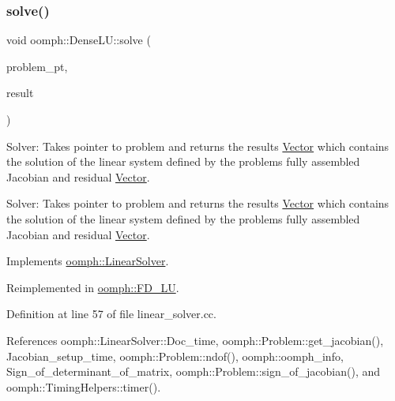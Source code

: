 \mbox{\label{classoomph_1_1DenseLU_ac354b224819146618ce8a1396f8f980e}} 
\subsubsection{\texorpdfstring{solve()}{solve()}\hspace{0.1cm}{\footnotesize\ttfamily [1/3]}}
{\footnotesize\ttfamily void oomph\+::\+Dense\+L\+U\+::solve (\begin{DoxyParamCaption}\item[{\hyperlink{classoomph_1_1Problem}{Problem} $\ast$const \&}]{problem\+\_\+pt,  }\item[{\hyperlink{classoomph_1_1DoubleVector}{Double\+Vector} \&}]{result }\end{DoxyParamCaption})\hspace{0.3cm}{\ttfamily [virtual]}}



Solver\+: Takes pointer to problem and returns the results \hyperlink{classoomph_1_1Vector}{Vector} which contains the solution of the linear system defined by the problem\textquotesingle{}s fully assembled Jacobian and residual \hyperlink{classoomph_1_1Vector}{Vector}. 

Solver\+: Takes pointer to problem and returns the results \hyperlink{classoomph_1_1Vector}{Vector} which contains the solution of the linear system defined by the problem\textquotesingle{}s fully assembled Jacobian and residual \hyperlink{classoomph_1_1Vector}{Vector}. 

Implements \hyperlink{classoomph_1_1LinearSolver_a15ce22542b74ed1826ea485edacbeb6e}{oomph\+::\+Linear\+Solver}.



Reimplemented in \hyperlink{classoomph_1_1FD__LU_a6fd251bef9cdb7efbed4927f005eda2f}{oomph\+::\+F\+D\+\_\+\+LU}.



Definition at line 57 of file linear\+\_\+solver.\+cc.



References oomph\+::\+Linear\+Solver\+::\+Doc\+\_\+time, oomph\+::\+Problem\+::get\+\_\+jacobian(), Jacobian\+\_\+setup\+\_\+time, oomph\+::\+Problem\+::ndof(), oomph\+::oomph\+\_\+info, Sign\+\_\+of\+\_\+determinant\+\_\+of\+\_\+matrix, oomph\+::\+Problem\+::sign\+\_\+of\+\_\+jacobian(), and oomph\+::\+Timing\+Helpers\+::timer().



